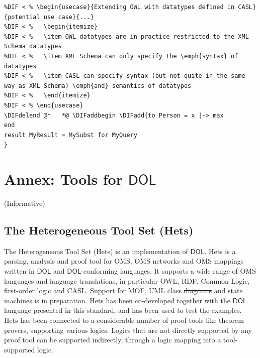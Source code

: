 \documentclass[10pt,fleqn,final]{scrreprt}
\makeatletter
\newcommand*\CommentAuthor{}
\renewcommand*\CommentAuthor{#1}}
\newcommand*\CommentDate{}
\renewcommand*\CommentDate{#1}}
\newcommand*\CommentId{}
\renewcommand*\CommentId{#1}}
\newcommand*\CommentType{}
\renewcommand*\CommentType{#1}}
\newcommand*{\SetCommentColorByType}[1]{%
\edef\localType{{#1}}%
\expandafter\ifstrequal\localType{q-aut}{\colorlet{CommentColor}{red}}{%
\expandafter\ifstrequal\localType{q-all}{\colorlet{CommentColor}{orange}}{%
\expandafter\ifstrequal\localType{todo}{\colorlet{CommentColor}{orange}}{%
\expandafter\ifstrequal\localType{fyi}{\colorlet{CommentColor}{lightgray}}{%
\colorlet{CommentColor}{yellow}}}}}}
\newcommand*{\SetCommentPrefixByType}[1]{%
\edef\localType{{#1}}%
\expandafter\@ifmtarg\localType{%
\edef\CommentPrefix{}%
}{%
\caseupper[q]{#1}%
\edef\CommentPrefix{\thestring: }%
}}
\newcommand*{\initComment}[1]{%
\setkeys{Comment}{#1}%
\SetCommentColorByType{\CommentType}%
\relax%
\SetCommentPrefixByType{\CommentType}%
\relax%
}
\newcommand*{\todonote}[2][]{%
\initComment{#1}%
\pdfcomment[author=\CommentAuthor,color=CommentColor,date=\CommentDate,id=\CommentId]{%
\CommentPrefix
#2}}
\renewcommand*{\todonote}[2][]{%
\initComment{#1}%
\ednote{\CommentPrefix #2}}
\newcommand*{\DOL}{\ensuremath{\mathsf{DOL}}\xspace}
\newcommand{\informative}[0]{{\begin{center}{\Large{(Informative})}\end{center}} \bigskip}
\newcommand{\sclause}[1]{\section{#1}}
\newcommand{\infannex}[1]{ \chapter{Annex: #1}  \informative }
\providecommand{\DIFadd}[1]{{\protect\color{blue}\uwave{#1}}} %
\providecommand{\DIFdel}[1]{{\protect\color{red}\sout{#1}}}                      %
\providecommand{\DIFaddbegin}{} %
\providecommand{\DIFaddend}{} %
\providecommand{\DIFdelbegin}{} %
\providecommand{\DIFdelend}{} %
\makeatother
\begin{document}
\begin{lstlisting}[basicstyle=\ttfamily,language=dolText,alsolanguage=CASL,escapechar=@,mathescape]
%DIFDELCMD < %%%
%DIF < % \begin{usecase}{Extending OWL with datatypes defined in CASL}{potential use case}{...}
%DIF < %   \begin{itemize}
%DIF < %   \item OWL datatypes are in practice restricted to the XML Schema datatypes
%DIF < %   \item XML Schema can only specify the \emph{syntax} of datatypes
%DIF < %   \item CASL can specify syntax (but not quite in the same way as XML Schema) \emph{and} semantics of datatypes
%DIF < %   \end{itemize}
%DIF < % \end{usecase}
\DIFdelend @*   *@ \DIFaddbegin \DIFadd{to Person = x |-> max
end
result MyResult = MySubst for MyQuery
}\end{lstlisting}
\DIFaddend 


\infannex{Tools for \DOL}\label{a:tools}

\sclause{The Heterogeneous Tool Set (Hets)}\label{a:hets} The
Heterogeneous Tool Set (Hets) is  an implementation  of
\DOL. Hets is a parsing, analysis and proof tool
for OMS, OMS networks and OMS mappings written in \DOL and
\DOL-conforming languages.  It supports a wide range of OMS languages
and language translations, in particular OWL, RDF, Common Logic,
first-order logic and CASL. Support for MOF, UML class \DIFdelbegin \DIFdel{diagrams }\DIFdelend \DIFaddbegin \DIFadd{models }\DIFaddend and
state machines is in preparation.  Hets has been co-developed together
with the \DOL language presented in this standard, and has been used to
test the examples. Hets has been connected to a considerable number of
proof tools like theorem provers, supporting various logics. Logics
that are not directly supported by any proof tool can be supported
indirectly, through a logic mapping into a tool-supported logic.
\end{document}
